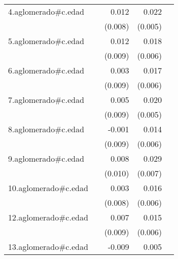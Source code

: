 {\begin{longtable}{l*{4}{D{.}{.}{-1}}}
\addlinespace
4.aglomerado#c.edad&                     &       0.012         &       0.022\sym{***}&                     \\
            &                     &     (0.008)         &     (0.005)         &                     \\
\addlinespace
5.aglomerado#c.edad&                     &       0.012         &       0.018\sym{**} &                     \\
            &                     &     (0.009)         &     (0.006)         &                     \\
\addlinespace
6.aglomerado#c.edad&                     &       0.003         &       0.017\sym{**} &                     \\
            &                     &     (0.009)         &     (0.006)         &                     \\
\addlinespace
7.aglomerado#c.edad&                     &       0.005         &       0.020\sym{***}&                     \\
            &                     &     (0.009)         &     (0.005)         &                     \\
\addlinespace
8.aglomerado#c.edad&                     &      -0.001         &       0.014\sym{*}  &                     \\
            &                     &     (0.009)         &     (0.006)         &                     \\
\addlinespace
9.aglomerado#c.edad&                     &       0.008         &       0.029\sym{***}&                     \\
            &                     &     (0.010)         &     (0.007)         &                     \\
\addlinespace
10.aglomerado#c.edad&                     &       0.003         &       0.016\sym{**} &                     \\
            &                     &     (0.008)         &     (0.006)         &                     \\
\addlinespace
12.aglomerado#c.edad&                     &       0.007         &       0.015\sym{*}  &                     \\
            &                     &     (0.009)         &     (0.006)         &                     \\
\addlinespace
13.aglomerado#c.edad&                     &      -0.009         &       0.005         &                     \\

\end{longtable}}
